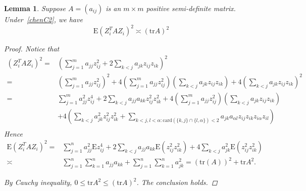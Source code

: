 \documentclass[review]{elsarticle}
\theoremstyle{plain}
\newtheorem{lemma}{Lemma}
\theoremstyle{definition}
\theoremstyle{remark}
\begin{document}
\begin{lemma}\label{lemmaQ}
    Suppose $A=(a_{ij})$ is an $m\times m$ positive semi-definite matrix. Under~\eqref{chenC2}, we have
    \begin{equation}
        \mathrm{E} {(Z_i^T A Z_i)}^2\asymp {(\mathrm{tr}A)}^2
    \end{equation}
\begin{proof}
Notice that
\begin{equation}
    \begin{aligned}
        {(Z_i^T A Z_i)}^2
        =&
        (\sum_{j=1}^m a_{jj}z_{ij}^2+2\sum_{k<j}a_{jk}z_{ij}z_{ik})^2\\
        =&
        (\sum_{j=1}^m a_{jj}z_{ij}^2)^2+
        4(\sum_{j=1}^m a_{jj}z_{ij}^2)(\sum_{k<j}a_{jk}z_{ij}z_{ik})+
        4(\sum_{k<j}a_{jk}z_{ij}z_{ik})^2\\
        =&
        \sum_{j=1}^m a_{jj}^2z_{ij}^4+2\sum_{k<j}a_{jj}a_{kk}z_{ij}^2 z_{ik}^2+
        4(\sum_{j=1}^m a_{jj}z_{ij}^2)(\sum_{k<j}a_{jk}z_{ij}z_{ik})\\
        &+
        4(\sum_{k<j}a_{jk}^2z_{ij}^2z_{ik}^2+\sum_{k<j,l<\alpha:\mathrm{card}(\{k,j\}\cap\{l,\alpha\})<2} a_{jk}a_{\alpha l}z_{ij}z_{ik}z_{i\alpha}z_{il})\\
    \end{aligned}
\end{equation}
Hence
\begin{equation}
    \begin{aligned}
        \mathrm{E}{(Z_i^T A Z_i)}^2
        =&
        \sum_{j=1}^n a_{jj}^2 \mathrm{E}z_{ij}^4+2\sum_{k<j}a_{jj}a_{kk}\mathrm{E}(z_{ij}^2 z_{ik}^2)+
        4\sum_{k<j}a_{jk}^2 \mathrm{E}(z_{ij}^2z_{ik}^2)\\
        \asymp &
        \sum_{j=1}^n\sum_{k=1}^n a_{jj}a_{kk}+
        \sum_{j=1}^n\sum_{k=1}^n a_{jk}^2
        ={(\mathrm{tr}(A))}^2+\mathrm{tr}A^2.
    \end{aligned}
\end{equation}

    By Cauchy inequality, $0\leq \mathrm{tr} A^2\leq {(\mathrm{tr}A)}^2$. The conclusion holds.

\end{proof}
\end{lemma}
\end{document}

